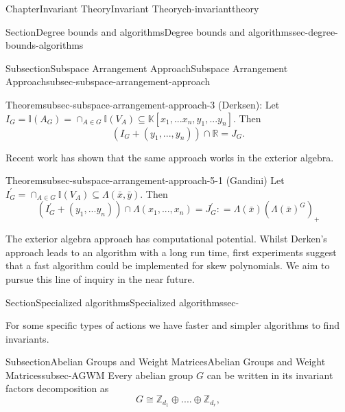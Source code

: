 \documentclass[oneside,10pt,]{book}
\newcommand{\R}{\mathbb R}
\begin{document}
\begin{chapterptx}{Chapter}{Invariant Theory}{}{Invariant Theory}{}{}{ch-invarianttheory}
\begin{sectionptx}{Section}{Degree bounds and algorithms}{}{Degree bounds and algorithms}{}{}{sec-degree-bounds-algorithms}
\begin{subsectionptx}{Subsection}{Subspace Arrangement Approach}{}{Subspace Arrangement Approach}{}{}{subsec-subspace-arrangement-approach}
\begin{theorem}{Theorem}{}{}{subsec-subspace-arrangement-approach-3}%
(Derksen): Let \(I_G = \mathbb{I}(A_G) = \cap_{A\in G}\mathbb{I}(V_A) \subseteq \mathbb{K}[x_1,...x_n,y_1,...y_n].\) Then%
\begin{equation*}
(I_G +(y_1,...,y_n)) \cap \R = J_G.
\end{equation*}
%
\end{theorem}
Recent work has shown that the same approach works in the exterior algebra.%
\par
\begin{theorem}{Theorem}{}{}{subsec-subspace-arrangement-approach-5-1}%
(Gandini) Let \(I_G^{'} = \cap_{A\in G} \mathbb{I}(V_A) \subseteq \Lambda(\bar x, \bar y)\). Then%
\begin{equation*}
(I_G^{'} +(y_1,...y_n)) \cap \Lambda(x_1,...,x_n) = J_G^{'} : = \Lambda(\bar x)(\Lambda(\bar x)^G)_+
\end{equation*}
%
\end{theorem}
%
\par
The exterior algebra approach has computational potential. Whilst Derken's approach leads to an algorithm with a long run time, first experiments suggest that a fast algorithm could be implemented for skew polynomials. We aim to pursue this line of inquiry in the near future.%
\end{subsectionptx}
\end{sectionptx}
%
%
\typeout{************************************************}
\typeout{************************************************}
%
\begin{sectionptx}{Section}{Specialized algorithms}{}{Specialized algorithms}{}{}{sec-}
\begin{introduction}{}%
For some specific types of actions we have faster and simpler algorithms to find invariants.%
\end{introduction}%
%
%
\typeout{************************************************}
\typeout{************************************************}
%
\begin{subsectionptx}{Subsection}{Abelian Groups and Weight Matrices}{}{Abelian Groups and Weight Matrices}{}{}{subsec-AGWM}
Every abelian group \(G\) can be written in its invariant factors decomposition as%
\begin{equation*}
G \cong \mathbb{Z}_{d_1} \oplus....\oplus \mathbb{Z}_{d_r}, 
\end{equation*}

\end{subsectionptx}
\end{sectionptx}
\end{chapterptx}
\end{document}
